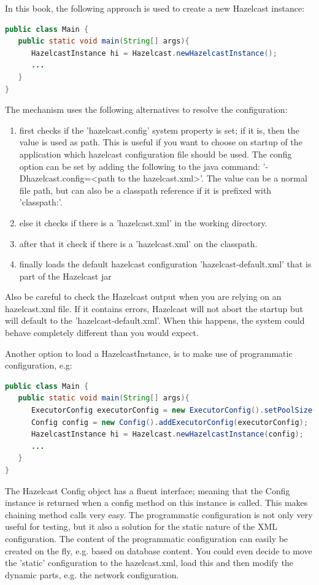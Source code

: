 In this book, the following approach is used to create a new Hazelcast instance:
\begin{lstlisting}[language=java]
public class Main {
   public static void main(String[] args){
      HazelcastInstance hi = Hazelcast.newHazelcastInstance();
      ...
   }
}
\end{lstlisting}
The mechanism uses the following alternatives to resolve the configuration:
\begin{enumerate}
\item first checks if the 'hazelcast.config' system property is set; if it is, then the value is used as path. This is useful if you want to choose on startup of the application which hazelcast configuration file should be used. The config option can be set by adding the following to the java command: '-Dhazelcast.config=<path to the hazelcast.xml>'. The value can be a normal file path, but can also be a classpath reference if it is prefixed with 'classpath:'. 
\item else it checks if there is a 'hazelcast.xml' in the working directory.
\item after that it check if there is a 'hazelcast.xml' on the classpath. 
\item finally loads the default hazelcast configuration 'hazelcast-default.xml' that is part of the Hazelcast jar
\end{enumerate}
Also be careful to check the Hazelcast output when you are relying on an hazelcast.xml file. If it contains errors, Hazelcast will not abort the startup but will default to the 'hazelcast-default.xml'. When this happens, the system could behave completely different than you would expect.

Another option to load a HazelcastInstance, is to make use of programmatic configuration, e.g: 
\begin{lstlisting}[language=java]
public class Main {
   public static void main(String[] args){
      ExecutorConfig executorConfig = new ExecutorConfig().setPoolSize(10);
      Config config = new Config().addExecutorConfig(executorConfig);	  
      HazelcastInstance hi = Hazelcast.newHazelcastInstance(config);
      ...
   }
}
\end{lstlisting}
The Hazelcast Config object has a fluent interface; meaning that the Config instance is returned when a config method on this instance is called. This makes chaining method calls very easy. The programmatic configuration is not only very useful for testing, but it also a solution for the static nature of the XML configuration. The content of the programmatic configuration can easily be created on the fly, e.g. based on database content. You could even decide to move the 'static' configuration to the hazelcast.xml, load this and then modify the dynamic parts, e.g. the network configuration.

